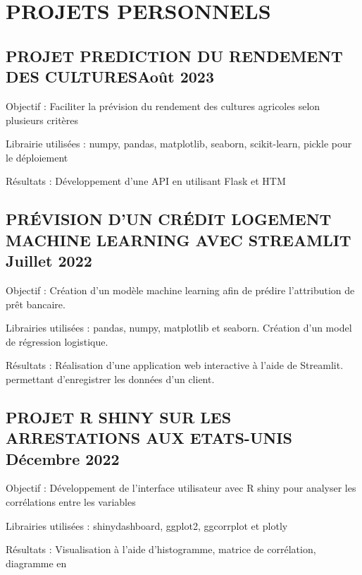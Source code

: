 \documentclass[letter,11pt]{article}
\begin{document}
\vspace{-5pt}
\section{PROJETS PERSONNELS}



\subsection{{PROJET PREDICTION DU RENDEMENT DES CULTURES\hfill  Août 2023 }}
\begin{zitemize}
\item Objectif : Faciliter la prévision du rendement des cultures agricoles selon plusieurs critères
\item Librairie utilisées : numpy, pandas, matplotlib, seaborn, scikit-learn, pickle pour le déploiement
\item Résultats : Développement d’une API en utilisant
Flask et HTM
\end{zitemize}


\subsection{{PRÉVISION D'UN CRÉDIT LOGEMENT MACHINE LEARNING AVEC STREAMLIT \hfill Juillet 2022 }}
\begin{zitemize}
\item Objectif : Création d’un modèle machine learning afin de prédire l’attribution de prêt bancaire. 
\item  Librairies utilisées : pandas, numpy, matplotlib et seaborn. Création d'un model de régression logistique.
\item Résultats : Réalisation d'une application web interactive à l'aide de Streamlit. permettant d’enregistrer les données d’un client. 
\end{zitemize}



\subsection{{PROJET R SHINY SUR LES ARRESTATIONS AUX ETATS-UNIS \hfill  Décembre 2022 }}
\begin{zitemize}
\item Objectif : Développement de l'interface utilisateur avec R shiny pour analyser les corrélations entre les variables
\item Librairies utilisées : shinydashboard, ggplot2, ggcorrplot et plotly
\item Résultats : Visualisation à l’aide d’histogramme, matrice de corrélation, diagramme en
\end{zitemize}
\end{document}
